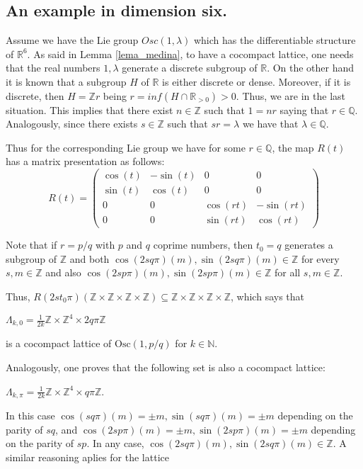 \documentclass[11pt]{amsart}
\theoremstyle{plain}
\theoremstyle{definition}
\theoremstyle{remark}
\begin{document}
	\subsection{An example in dimension six.} Assume we have the Lie group $Osc(1,\lambda)$ which has the differentiable structure of $\mathbb R^6$. As said in Lemma \ref{lema_medina}, to have a cocompact lattice, one needs that the real numbers $1,\lambda$ generate a discrete subgroup of $\mathbb R$. 
		On the other hand it is known that a subgroup $H$ of $\mathbb R$ is either discrete or dense. Moreover, if it is discrete, then $H=\mathbb Z r$ being $r=inf(H\cap \mathbb R_{>0})>0$. Thus, we are  in  the last situation. 
	This implies that there exist $n\in \mathbb Z$ such that $1=nr$ saying that $r\in \mathbb Q$. Analogously, since there exists $s\in \mathbb Z$ such that $sr=\lambda$ we have that $\lambda \in \mathbb Q$. 
	
Thus for the corresponding Lie group we have for some $r\in \mathbb Q$, the map $R(t)$ has a matrix presentation as follows:
$$R(t)=\left( \begin{matrix} 
\cos(t) & -\sin(t) & 0 & 0\\
\sin(t) & \cos(t) &0 & 0\\
0 & 0 & \cos(r t) & -\sin(rt)\\
0 & 0 & \sin(rt) & \cos(rt)
\end{matrix}
\right)$$
 
 Note that if $r=p/q$ with $p$ and $q$ coprime numbers, then $t_0=q$ generates a subgroup of $\mathbb Z$ and both $\cos(2sq\pi)(m),\sin(2sq\pi)(m)\in \mathbb Z$ for every $s,m\in \mathbb Z$ and also $\cos(2sp\pi)(m),\sin(2sp\pi)(m)\in \mathbb Z$ for all $s,m\in \mathbb Z$. 
 
 Thus, $R(2st_0\pi)(\mathbb Z\times \mathbb Z\times \mathbb Z\times \mathbb Z)\subseteq \mathbb Z\times \mathbb Z\times \mathbb Z\times \mathbb Z$, which says that 
    
 $\Lambda_{k,0}=\frac1{2k} \mathbb Z\times \mathbb Z^4 \times 2q\pi\mathbb Z$ 
 
 is a cocompact lattice of $\mathrm{Osc}(1,p/q)$ for $k\in \mathbb N$.
 
 Analogously, one proves that the following set is also a cocompact lattice:
 
  $\Lambda_{k,\pi}=\frac1{2k} \mathbb Z\times \mathbb Z^4 \times q\pi\mathbb Z$. 
  
  In this case $\cos(sq\pi)(m)=\pm m,\sin(sq\pi)(m)=\pm m$ depending on the parity of $sq$, and  $\cos(2sp\pi)(m)=\pm m,\sin(2sp\pi)(m)=\pm m$  depending on the parity of $sp$. In any case, $\cos(2sq\pi)(m),\sin(2sq\pi)(m)\in \mathbb Z$. A similar reasoning aplies for  the lattice 
  
\end{document}
